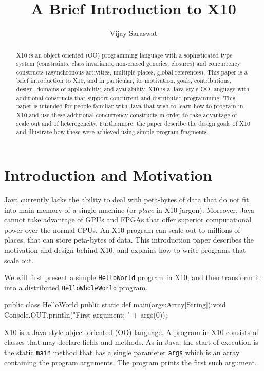 \documentclass[a4paper]{article}
\title{A Brief Introduction to X10}
\author{Vijay Saraswat}
\date{}
\def\codesmaller{\small}
\newcommand{\code}[1]{\texttt{\textup{\codesmaller #1}}}
\begin{document}
\maketitle


\begin{abstract}
X10 is an object oriented (OO) programming language with a sophisticated
    type system (constraints, class invariants, non-erased generics, closures)
    and concurrency constructs (asynchronous activities, multiple places, global references).
This paper is a brief introduction to X10, and in particular,
    its motivation, goals,
    contributions, design, domains of applicability, and availability.
X10 is a Java-style OO language with additional constructs that support concurrent and distributed programming.
This paper is intended for people familiar with Java that wish to learn how to program in X10
    and use these additional concurrency constructs in order to take advantage of scale out and of heterogeneity.
Furthermore, the paper describe the design goals of X10 and illustrate how these were achieved
    using simple program fragments.
\end{abstract}

\section{Introduction and Motivation}
Java currently lacks the ability to deal with peta-bytes of data
    that do not fit into main memory of a single machine (or \emph{place} in X10 jargon).
Moreover, Java cannot take advantage of GPUs and FPGAs that offer superior
    computational power over the normal CPUs.
An X10 program can scale out to millions of places, that can store peta-bytes of data.
This introduction paper describes the motivation and design behind X10,
    and explains how to write programs that scale out.

We will first present a simple \code{HelloWorld} program in X10,
    and then transform it into a distributed \code{HelloWholeWorld} program.

\begin{xten}
public class HelloWorld {
  public static def main(args:Array[String]):void {
     Console.OUT.println("First argument: " + args(0));
  }
}
\end{xten}
X10 is a Java-style object oriented (OO) language.
A program in X10 consists of classes that may
    declare fields and methods.
As in Java, the start of execution is the static \code{main} method
    that has a single parameter \code{args} which is an array containing the program arguments.
The program prints the first such argument.
\end{document}
